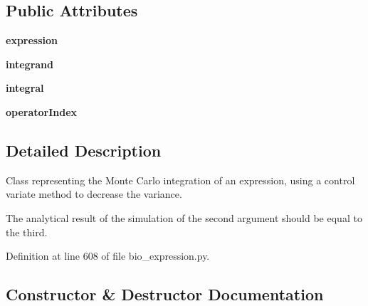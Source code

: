\subsection*{Public Attributes}
\begin{DoxyCompactItemize}
\item 
{\bfseries expression}\hypertarget{classbio__expression_1_1_monte_carlo_control_variate_ace3674ea59f77ad5287b637cabfb96fa}{}\label{classbio__expression_1_1_monte_carlo_control_variate_ace3674ea59f77ad5287b637cabfb96fa}

\item 
{\bfseries integrand}\hypertarget{classbio__expression_1_1_monte_carlo_control_variate_a8817d0854624dc731d4a20aa2e146aa5}{}\label{classbio__expression_1_1_monte_carlo_control_variate_a8817d0854624dc731d4a20aa2e146aa5}

\item 
{\bfseries integral}\hypertarget{classbio__expression_1_1_monte_carlo_control_variate_abccab1ed044a5a080cda411627c4a05c}{}\label{classbio__expression_1_1_monte_carlo_control_variate_abccab1ed044a5a080cda411627c4a05c}

\item 
{\bfseries operator\+Index}\hypertarget{classbio__expression_1_1_monte_carlo_control_variate_a1a35f20f1613dd3ccdb818441fd1c040}{}\label{classbio__expression_1_1_monte_carlo_control_variate_a1a35f20f1613dd3ccdb818441fd1c040}

\end{DoxyCompactItemize}


\subsection{Detailed Description}
Class representing the Monte Carlo integration of an expression, using a control variate method to decrease the variance. 

The analytical result of the simulation of the second argument should be equal to the third. 

Definition at line 608 of file bio\+\_\+expression.\+py.



\subsection{Constructor \& Destructor Documentation}
